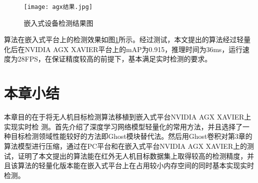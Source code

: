 \begin{figure}[htbp]
    \centering
    \texttt{[image: agx结果.jpg]}
    \caption{嵌入式设备检测结果图}
    \label{agxo}
\end{figure}

算法在嵌入式平台上的检测效果如图\ref{agxo}所示。经过测试，本文提出的算法经过轻量化后在NVIDIA AGX XAVIER平台上的mAP为0.915，推理时间为36ms，运行速度为28FPS，在保证精度较高的前提下，基本满足实时检测的要求。

\section{本章小结}
本章目的在于将无人机目标检测算法移植到嵌入式平台NVIDIA AGX XAVIER上实现实时检
测。首先介绍了深度学习网络模型轻量化的常用方法，并且选择了一种目标检测领域性能较好的方法即Ghost模块替代法。然后用Ghost卷积对第3章的算法模型进行压缩，通过在PC平台和在嵌入式平台NVIDIA AGX XAVIER上的测试，证明了本文提出的算法能在红外无人机目标数据集上取得较高的检测精度，并且该算法的轻量化版本能在嵌入式平台上在占用较小内存空间的同时基本实现实时检测。

